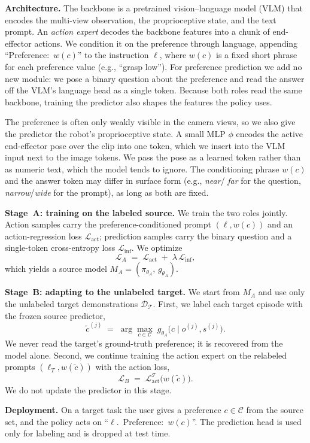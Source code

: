 \textbf{Architecture.}
The backbone is a pretrained vision--language model (VLM) that encodes the
multi-view observation, the proprioceptive state, and the text prompt. An
\emph{action expert} decodes the backbone features into a chunk of end-effector
actions. We condition it on the preference through language, appending
``Preference:~$w(c)$'' to the instruction $\ell$, where $w(c)$ is a fixed short
phrase for each preference value (e.g., ``grasp low''). For preference
prediction we add no new module: we pose a binary question about the preference
and read the answer off the VLM's language head as a single token. Because both
roles read the same backbone, training the predictor also shapes the features
the policy uses.

The preference is often only weakly visible in the camera views, so we also give
the predictor the robot's proprioceptive state. A small MLP $\phi$ encodes the
active end-effector pose over the clip into one token, which we insert into the
VLM input next to the image tokens. We pass the pose as a learned token rather
than as numeric text, which the model tends to ignore. The conditioning phrase
$w(c)$ and the answer token may differ in surface form (e.g., \emph{near}/%
\emph{far} for the question, \emph{narrow}/\emph{wide} for the prompt), as long
as both are fixed.

\textbf{Stage~A: training on the labeled source.}
We train the two roles jointly. Action samples carry the preference-conditioned
prompt $(\ell,w(c))$ and an action-regression loss
$\mathcal{L}_{\mathrm{act}}$; prediction samples carry the binary question and a
single-token cross-entropy loss $\mathcal{L}_{\mathrm{inf}}$. We optimize
\begin{equation}
  \mathcal{L}_{A} \;=\; \mathcal{L}_{\mathrm{act}} \;+\; \lambda\,\mathcal{L}_{\mathrm{inf}},
  \label{eq:stageA}
\end{equation}
which yields a source model $M_A=(\pi_{\theta_A},\,g_{\theta_A})$.

\textbf{Stage~B: adapting to the unlabeled target.}
We start from $M_A$ and use only the unlabeled target demonstrations
$\mathcal{D}_{\mathcal{T}}$. First, we label each target episode with the frozen
source predictor,
\begin{equation}
  \tilde{c}^{(j)} \;=\; \arg\max_{c\in\mathcal{C}}\; g_{\theta_A}\!\big(c \mid o^{(j)},s^{(j)}\big).
  \label{eq:pseudolabel}
\end{equation}
We never read the target's ground-truth preference; it is recovered from the
model alone. Second, we continue training the action expert on the relabeled
prompts $(\ell_T,w(\tilde{c}))$ with the action loss,
\begin{equation}
  \mathcal{L}_{B} \;=\; \mathcal{L}^{\mathcal{T}}_{\mathrm{act}}\!\big(w(\tilde{c})\big).
  \label{eq:stageB}
\end{equation}
We do not update the predictor in this stage.

\textbf{Deployment.}
On a target task the user gives a preference $c\in\mathcal{C}$ from the source
set, and the policy acts on ``$\ell$.~Preference:~$w(c)$''. The prediction head
is used only for labeling and is dropped at test time.
